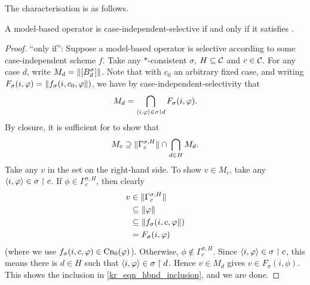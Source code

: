 The characterisation is as follows.

\begin{theorem}
    \label{kr_thm_case_independent_selectivity_characterisation}
    A model-based operator is case-independent-selective if and only if it
    satisfies \hboundedness{}.
\end{theorem}

\begin{proof}

    ``only if'': Suppose a model-based operator is selective
    according to some case-independent scheme $f$. Take any $\ast$-consistent
    $\sigma$, $H \subseteq \mathcal{C}$ and $c \in \mathcal{C}$. For any case $d$, write $M_d =
    \|{\left[{B^\sigma_d}\right]}\|$. Note that with $c_0$ an
    arbitrary fixed case, and writing $F_\sigma(i, \varphi) =
    \|{f_\sigma(i, c_0, \varphi}\|)$, we have by case-independent-selectivity
    that
    \[
        M_d = \bigcap_{\langle {i, \varphi} \rangle \in \sigma \upharpoonright d}{
            F_\sigma(i, \varphi)
        }.
    \]
    By closure, it is sufficient for \hboundedness{} to show that
    \begin{equation}
        \label{kr_eqn_hbnd_inclusion}
        M_c
        \supseteq
        \|{\Gamma^{\sigma, H}_c}\| \cap \bigcap_{d \in H}{M_d}.
    \end{equation}
    Take any $v$ in the set on the right-hand side. To show $v \in M_c$, take
    any $\langle {i, \varphi} \rangle \in \sigma \upharpoonright c$. If $\phi \in \Gamma^{\sigma, H}_c$,
    then clearly
    \begin{align*}
        v
        &\in \|{\Gamma^{\sigma, H}_c}\| \\
        &\subseteq \|{\varphi}\| \\
        &\subseteq \|{f_\sigma(i, c, \varphi}\|) \\
        &= F_\sigma(i, \varphi)
    \end{align*}
    (where we use $f_\sigma(i, c, \varphi) \in \operatorname{Cn}_0(\varphi)$). Otherwise, $\phi
    \notin \Gamma^{\sigma, H}_c$. Since $\langle {i, \varphi} \rangle \in \sigma \upharpoonright c$,
    this means there is $d \in H$ such that $\langle {i, \varphi} \rangle \in \sigma \upharpoonright d$.
    Hence $v \in M_d$ gives $v \in F_\sigma(i, \phi)$. This shows the inclusion
    in \cref{kr_eqn_hbnd_inclusion}, and we are done.


\end{proof}
